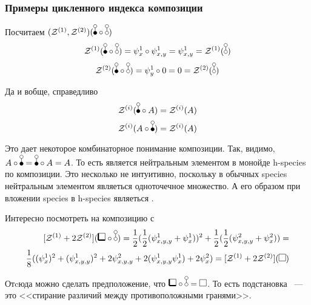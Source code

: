\subsubsection{Примеры цикленного индекса композиции}
\begin{example}
Посчитаем $(\Zone, \Ztwo)(\dB \circ \dA)$
$$
\Zone(\dB \circ \dA) = \psi_{x}^1 \circ \psi_{x, y}^1 = \psi_{x, y}^1
= \Zone(\dA)
$$ 
$$
\Ztwo(\dB \circ \dA) = \psi_{y}^1 \circ 0 = 0 = \Ztwo(\dA)
$$
\end{example}
\begin{example}
Да и вобще, справедливо
$$
\Zi(\dB \circ A) = \Zi(A)
$$ 
$$
\Zi(A \circ \dB) = \Zi(A)
$$
\end{example}
\begin{remark}
Это дает некоторое комбинаторное понимание композиции. Так, видимо, $A \circ \dB
= \dB \circ A = A$. То есть \dB является нейтральным элементом в монойде h-species по
композиции.
Это несколько не интуитивно, поскольку в обычных species нейтральным
элементом являеться одноточечное множество. А его образом при вложении species в
h-species являеться \dA.
\end{remark}
\begin{example}
Интересно посмотреть на композицию с \dA
\begin{equation}
\begin{split}
\Zfull(\dBB \circ \dA) = \frac{1}{2} (\frac{1}{2}(\psi_{x,y,y}^1 +
\psi_{x}^1))^2 + \frac{1}{2} (\frac{1}{2}(\psi_{x,y,y}^2 +
\psi_{x}^2)) = \\
\frac{1}{8}((\psi_{x}^1)^2 + (\psi_{x, y, y}^1)^2 +
2\psi_{x, y, y}^2 + 2(\psi_{x, y, y}^1\psi_{x}^1) + 2\psi_{x}^2) =
\Zfull(\dAA)
\end{split}
\end{equation}
\begin{remark}
Отcюда можно сделать предположение, что $\dBB \circ \dA = \dAA$.
То есть подстановка \dA~--- это <<стирание различий между противоположными
гранями>>.
\end{remark}
\end{example}
